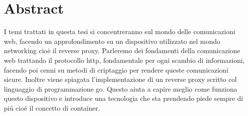 \chapter*{Abstract}
\label{cha:abtract}
I temi trattati in questa tesi si concentreranno sul mondo delle comunicazioni web, facendo un approfondimento su un dispositivo utilizzato nel mondo networking cioė il reverse proxy. Parleremo dei fondamenti della comunicazione web trattando il protocollo http, fondamentale per ogni scambio di informazioni, facendo poi cenni su metodi di criptaggio per rendere queste comunicazioni sicure. Inoltre viene spiagata l'implementazione di un reverse proxy scritto col linguaggio di programmazione go. Questo aiuta a capire meglio come funziona questo dispositivo e introduce una tecnologia che sta prendendo piede sempre di piú cioé il concetto di container.
